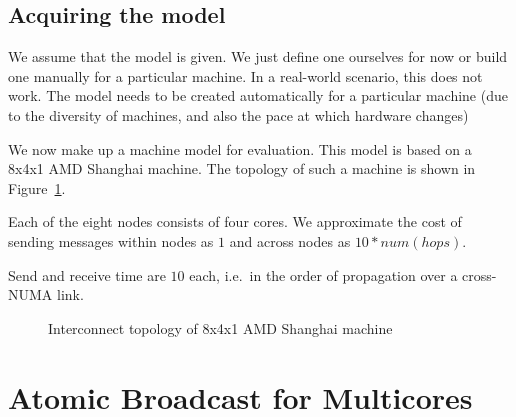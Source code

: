 \documentclass{article}
\begin{document}
\subsection{Acquiring the model}

We assume that the model is given. We just define one ourselves for
now or build one manually for a particular machine. In a real-world
scenario, this does not work. The model needs to be created
automatically for a particular machine (due to the diversity of
machines, and also the pace at which hardware changes)

We now make up a machine model for evaluation. This model is based on
a 8x4x1 AMD Shanghai machine. The topology of such a machine is shown
in Figure~\ref{fig:gruyere}.

Each of the eight nodes consists of four cores. We approximate the
cost of sending messages within nodes as $1$ and across nodes as
$10*num(hops)$.

Send and receive time are $10$ each, i.e.\ in the order of propagation
over a cross-NUMA link.

\begin{figure}[htb]
  \centering
  \caption{Interconnect topology of 8x4x1 AMD Shanghai machine}
  \label{fig:gruyere}
\end{figure}

\section{Atomic Broadcast for Multicores}
\end{document}
